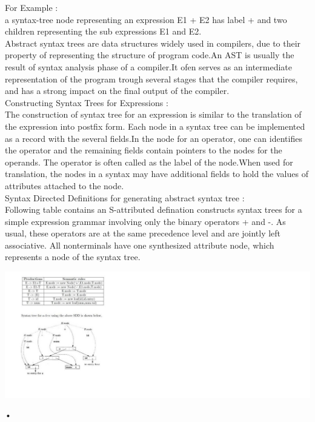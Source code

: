 \documentclass[11pt]{article}
\begin{document}
	\noindent
	For Example :\\
	a syntax-tree node representing an expression E1 + E2 has label + and two children representing the sub expressions E1 and E2.\\
	Abstract syntax trees are data structures widely used in compilers, due to their property of representing the structure of program code.An AST is usually the result of syntax analysis phase of a compiler.It ofen serves as an intermediate representation of the program trough several stages that the compiler requires, and has a strong impact on the final output of the compiler.\\
	
	\noindent
	Constructing Syntax Trees for Expressions :\\
	
	The construction of syntax tree for an expression is similar to the translation of the expression into postfix form.
	Each node in a syntax tree can be implemented as a record with the several fields.In the node for an operator, one can identifies the operator and the remaining fields contain pointers to the nodes for the operands. The operator is often called as the label of the node.When used for translation, the nodes in a syntax may have additional fields to hold the values of attributes attached to the node.\\
	
	\noindent
	Syntax Directed Definitions for generating abstract syntax tree :\\
	
	Following table contains an S-attributed defination constructs syntax trees for a simple expression grammar involving only the binary operators + and -. As usual, these operators are at the same precedence level and are jointly left associative. All nonterminals have one synthesized attribute node, which represents a node of the syntax tree.\\
	
	\begin{center}
		\includegraphics{tem.png}
	\end{center}•
	
\end{document}
